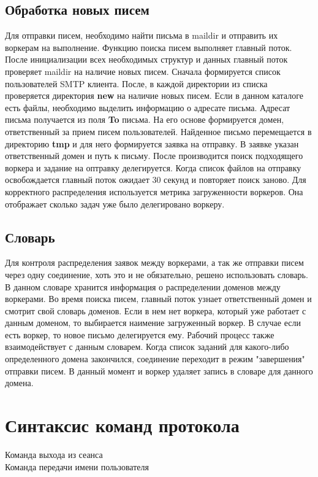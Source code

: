 \documentclass[a4paper,12pt]{report}
\begin{document}
\subsection{Обработка новых писем}
Для отправки писем, необходимо найти письма в maildir и отправить их воркерам на выполнение. Функцию поиска писем выполняет главный поток. После инициализации всех необходимых структур и данных главный поток проверяет maildir на наличие новых писем. Сначала формируется список пользователей SMTP клиента. После, в каждой директории из списка проверяется директория \textbf{new} на наличие новых писем. Если в данном каталоге есть файлы, необходимо выделить информацию о адресате письма. Адресат письма получается из поля \textbf{To} письма. На его основе формируется домен, ответственный за прием писем пользователей. 
Найденное письмо перемещается в директорию \textbf{tmp} и для него формируется заявка на отправку. В заявке указан ответственный домен и путь к письму. После производится поиск подходящего воркера и задание на оптравку делегируется. Когда список файлов на отправку освобождается главный поток ожидает 30 секунд и повторяет поиск заново. Для корректного распределения используется метрика загруженности воркеров. Она отображает сколько задач уже было делегировано воркеру.

\subsection{Словарь}
Для контроля распределения заявок между воркерами, а так же отправки писем через одну соединение, хоть это и не обязательно, решено использовать словарь. В данном словаре хранится информация о распределении доменов между воркерами. Во время поиска писем, главный поток узнает ответственный домен и смотрит свой словарь доменов. Если в нем нет воркера, который уже работает с данным доменом, то выбирается наимение загруженный воркер. В случае если есть воркер, то новое письмо делегируется ему.
Рабочий процесс также взаимодействует с данным словарем. Когда список заданий для какого-либо определенного домена закончился, соединение переходит в режим "завершения" отправки писем. В данный момент и воркер удаляет запись в словаре для данного домена.

\section{Синтаксис команд протокола}

\begin{description}
\item[Команда выхода из сеанса]
% 
\item[Команда передачи имени пользователя]
% 
\end{description}
\end{document}
